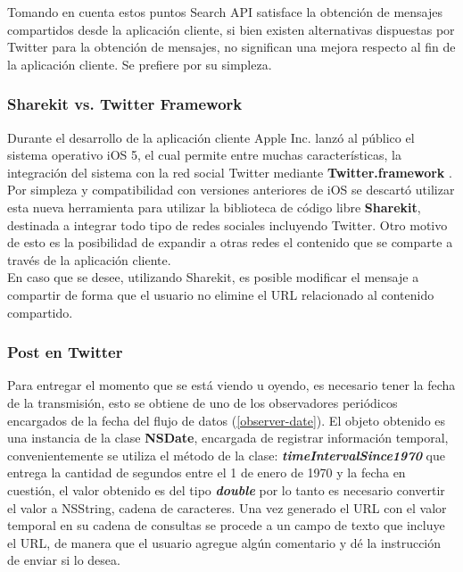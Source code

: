 Tomando en cuenta estos puntos Search API satisface la obtención de mensajes compartidos desde la aplicación cliente, si bien existen alternativas dispuestas por Twitter para la obtención de mensajes, no significan una mejora respecto al fin de la aplicación cliente. Se prefiere por su simpleza.
		
		\subsubsection{Sharekit vs. Twitter Framework}
Durante el desarrollo de la aplicación cliente Apple Inc. lanzó al público el sistema operativo iOS 5, el cual permite entre muchas características, la integración del sistema con la red social Twitter mediante \textbf{Twitter.framework} . Por simpleza y compatibilidad con versiones anteriores de iOS se descartó utilizar esta nueva herramienta para utilizar la biblioteca de código libre \textbf{Sharekit}\cite{library-sharekit}, destinada a integrar todo tipo de redes sociales incluyendo Twitter. Otro motivo de esto es la posibilidad de expandir a otras redes el contenido que se comparte a través de la aplicación cliente. \\

En caso que se desee, utilizando Sharekit, es posible modificar el mensaje a compartir de forma que el usuario no elimine el URL relacionado al contenido compartido.

		\subsubsection{Post en Twitter}
		Para entregar el momento que se está viendo u oyendo, es necesario tener la fecha de la transmisión, esto se obtiene de uno de los observadores periódicos encargados de la fecha del flujo de datos (\ref{observer-date}). El objeto obtenido es una instancia de la clase \textbf{NSDate}, encargada de registrar información temporal, convenientemente se utiliza el método de la clase: \textit{\textbf{timeIntervalSince1970}} que entrega la cantidad de segundos entre el 1 de enero de 1970 y la fecha en cuestión, el valor obtenido es del tipo \textbf{\textit{double}} por lo tanto es necesario convertir el valor a NSString, cadena de caracteres. Una vez generado el URL con el valor temporal en su cadena de consultas se procede a un campo de texto que incluye el URL, de manera que el usuario agregue algún comentario y dé la instrucción de enviar si lo desea.
		
